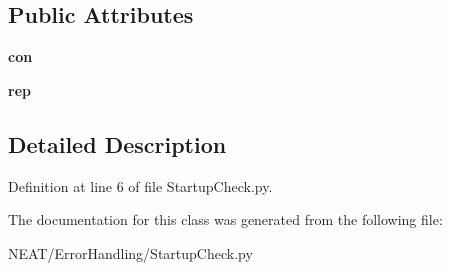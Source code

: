 \subsection*{Public Attributes}
\begin{DoxyCompactItemize}
\item 
{\bfseries con}\hypertarget{class_n_e_a_t___py_genetics_1_1_n_e_a_t_1_1_error_handling_1_1_startup_check_1_1_startup_check_afca8d845c7a7796c0963e0d49ec96786}{}\label{class_n_e_a_t___py_genetics_1_1_n_e_a_t_1_1_error_handling_1_1_startup_check_1_1_startup_check_afca8d845c7a7796c0963e0d49ec96786}

\item 
{\bfseries rep}\hypertarget{class_n_e_a_t___py_genetics_1_1_n_e_a_t_1_1_error_handling_1_1_startup_check_1_1_startup_check_a9defc0bb9535a560af330658f89337ac}{}\label{class_n_e_a_t___py_genetics_1_1_n_e_a_t_1_1_error_handling_1_1_startup_check_1_1_startup_check_a9defc0bb9535a560af330658f89337ac}

\end{DoxyCompactItemize}


\subsection{Detailed Description}


Definition at line 6 of file Startup\+Check.\+py.



The documentation for this class was generated from the following file\+:\begin{DoxyCompactItemize}
\item 
N\+E\+A\+T/\+Error\+Handling/Startup\+Check.\+py\end{DoxyCompactItemize}
